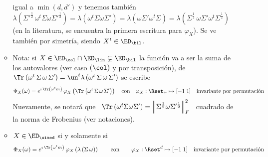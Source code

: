 \begin{itemize}
\begin{itemize}
  igual a  $\min(d,d')$ y tenemos tambi\'en  $\lambda\left( \Sigma'^{\frac12} \,
    \omega^t \Sigma  \omega \Sigma'^{\frac12} \right)  = \lambda(\omega^t \Sigma
  \omega  \Sigma') =  \lambda(\omega  \Sigma' \omega^t  \Sigma) =  \lambda\left(
    \Sigma^{\frac12}    \,     \omega    \Sigma'    \omega^t    \Sigma^{\frac12}
  \right)$~\cite[Teo.~21.10.1(2)]{Har08}  (en  la  literatura, se  encuentra  la
  primera escritura para $\varphi_X$).  Se ve tambi\'en por simetr\'ia,
  siendo $X^t \in \ED_\bil$.
\item  Nota:  si  $X  \in  \ED_\col \cap  \ED_\lin  \varsubsetneq  \ED_\bil$  la
  funci\'on  va a  ser  la suma  de los  autovalores  (ver caso  $(\col)$ y  por
  transposici\'on), \ie  de $\Tr\left( \omega^t  \, \Sigma \, \omega  \, \Sigma'
  \right) = \un^t \lambda\left( \omega^t \, \Sigma \, \omega \, \Sigma' \right)$
  se escribe
  \[
  \Phi_X(\omega) = e^{\imath \, \Tr\left( \omega^t m \right)} \, \varphi_X\left(
    \Tr\left( \omega^t  \, \Sigma  \, \omega \,  \Sigma' \right)  \right) \quad
  \mbox{con} \quad \varphi_X: \Rset_+ \mapsto [-1 \; 1]   \quad   \mbox{invariante   por
    permutaci\'on}%
  \]
  Nuevamente,  se  notar\'a que  \  $\Tr\left(  \omega^t  \Sigma \omega  \Sigma'
  \right)  = \left\| \Sigma^{\frac12}  \omega \Sigma'^{\frac12}  \right\|_F^2$ \
  cuadrado de la norma de Frobenius (ver notaciones).
\item $X \in \ED_\simed$ si y solamente si
  \[
  \Phi_X(\omega) = e^{\imath \, \Tr\left( \omega^t m \right)} \, \varphi_X\left(
    \lambda\left(  \Sigma \,  \omega  \right) \right)  \qquad \mbox{con}  \qquad
  \varphi_X:   \Rset^d   \mapsto   [-1   \;  1]   \quad   \mbox{invariante   por
    permutaci\'on}%
  \]

\end{itemize}
\end{itemize}
